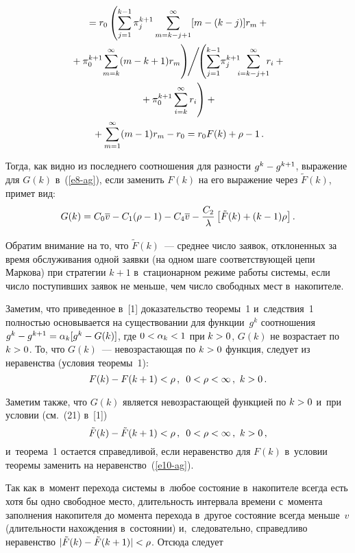 \begin{multicols}{2}
\columnbreak

\noindent
\begin{multline*}
  {}=r_0\left(\sum\limits_{j=1}^{k-1} \pi_j^{k+1}\sum\limits^\infty_{m=k-
j+1} [m-(k-j)]r_m +{}\right.\\
\left.{}+\pi_0^{k+1}\! \sum\limits^\infty_{m=k}(m-k+1)r_m
\vphantom{\sum\limits^{k-1}_{j=1}}
\right)\!\!\Bigg/ \!\!
\left(\sum\limits^{k-1}_{j=1}\!\pi_j^{k+1} \!\!\!
\sum\limits^\infty_{i=k-j+1}\!\!\! r_i 
+{}\right.\\
\left.{}+\pi_0^{k+1} \sum\limits^\infty_{i=k}r_i
\vphantom{\sum\limits^{k-1}_{j=1}}
\right)+{}\\
  {}+ \sum\limits^\infty_{m=1} (m-1)r_m-r_0=r_0F(k)+\rho-1\,.
  \end{multline*}
  
  
  
  Тогда, как видно из последнего соотношения для разности $g^k\hm- 
g^{k+1}$, выражение для $G(k)$ в~(\ref{e8-ag}), если заменить $F(k)$ на его 
выражение через $\tilde{F}(k)$, примет вид: 
  $$
  G(k)=C_0\overline{v} -C_1(\rho-1) -C_4\overline{v} -\displaystyle\frac{\displaystyle C_2\mathstrut}{\displaystyle \lambda\mathstrut} \left[ 
\tilde{F}(k)+(k-1)\rho\right].
  $$
  
  Обратим внимание на то, что $\tilde{F}(k)$~--- среднее число заявок, 
отклоненных за время обслуживания одной заявки (на одном шаге 
соответствующей цепи Маркова) при стратегии $k+1$ в~стационарном режиме 
работы системы, если число поступивших заявок не меньше, чем число 
свободных мест в~накопителе.
  
  Заметим, что приведенное в~[1] доказательство теоремы~1 и~следствия~1 
полностью основывается на существовании для функции~$g^k$ соотношения 
$g^k\hm- g^{k+1}\hm= \alpha_k[g^k\hm- G(k)]$, где $0\hm<\alpha_k\hm<1$ при 
$k\hm>0$, $G(k)$ не возрастает по $k\hm>0$. То, что $G(k)$~--- 
не\-воз\-рас\-та\-ющая по $k\hm>0$ функция, следует из неравенства (условия 
теоремы~1):
  $$
  F(k)-F(k+1)<\rho\,,\enskip 0<\rho<\infty\,,\ k>0\,.
  $$

Заметим также, что $G(k)$ является не\-воз\-рас\-та\-ющей функцией по $k\hm>0$ 
и~при условии (см.~(21) в~[1])
\begin{equation}
\tilde{F}(k) -\tilde{F}(k+1) <\rho\,,\enskip 0<\rho<\infty\,,\ k>0\,,
\label{e10-ag}
\end{equation}
и~теорема~1 остается справедливой, если неравенство для $F(k)$ в~условии 
теоремы заменить на неравенство~(\ref{e10-ag}). 

  Так как в~момент перехода системы в~любое состояние в~накопителе всегда 
есть хотя бы одно свободное место, длительность интервала времени с~момента 
заполнения накопителя до момента перехода в~другое состояние всегда 
меньше~$v$ (длительности нахождения в~состоянии) и,~следовательно, 
справедливо неравенство $\vert \tilde{F}(k)\hm-\tilde{F}(k\hm+1)\vert <\rho$. Отсюда следует


\end{multicols}
